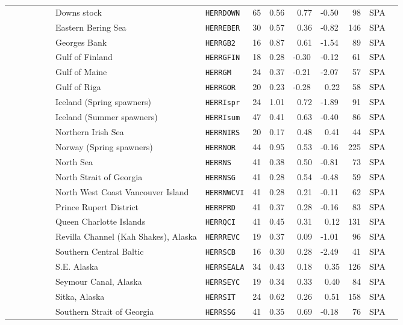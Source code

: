 \begin{flushleft}
\begin{tabular*}{7.1in}{llllllllll}
&~~~~~~~~~Downs stock&{\tt HERRDOWN}&65&0.56&~0.77&-0.50&~98&SPA  & \\ 
&~~~~~~~~~Eastern Bering Sea&{\tt HERREBER}&30&0.57&~0.36&-0.82&146&SPA  & \\ 
&~~~~~~~~~Georges Bank&{\tt HERRGB2}&16&0.87&~0.61&-1.54&~89&SPA  & \\ 
&~~~~~~~~~Gulf of Finland&{\tt HERRGFIN}&18&0.28&-0.30&-0.12&~61&SPA  & \\ 
&~~~~~~~~~Gulf of Maine&{\tt HERRGM}&24&0.37&-0.21&-2.07&~57&SPA  & \\ 
&~~~~~~~~~Gulf of Riga&{\tt HERRGOR}&20&0.23&-0.28&~0.22&~58&SPA  & \\ 
&~~~~~~~~~Iceland (Spring spawners)&{\tt HERRIspr}&24&1.01&~0.72&-1.89&~91&SPA  & \\ 
&~~~~~~~~~Iceland (Summer spawners)&{\tt HERRIsum}&47&0.41&~0.63&-0.40&~86&SPA  & \\ 
&~~~~~~~~~Northern Irish Sea&{\tt HERRNIRS}&20&0.17&~0.48&~0.41&~44&SPA  & \\ 
&~~~~~~~~~Norway (Spring spawners)&{\tt HERRNOR}&44&0.95&~0.53&-0.16&225&SPA  & \\ 
&~~~~~~~~~North Sea&{\tt HERRNS}&41&0.38&~0.50&-0.81&~73&SPA  & \\ 
&~~~~~~~~~North Strait of Georgia&{\tt HERRNSG}&41&0.28&~0.54&-0.48&~59&SPA  & \\ 
&~~~~~~~~~North West Coast Vancouver Island&{\tt HERRNWCVI}&41&0.28&~0.21&-0.11&~62&SPA  & \\ 
&~~~~~~~~~Prince Rupert District&{\tt HERRPRD}&41&0.37&~0.28&-0.16&~83&SPA  & \\ 
&~~~~~~~~~Queen Charlotte Islands&{\tt HERRQCI}&41&0.45&~0.31&~0.12&131&SPA  & \\ 
&~~~~~~~~~Revilla Channel (Kah Shakes), Alaska&{\tt HERRREVC}&19&0.37&~0.09&-1.01&~96&SPA  & \\ 
&~~~~~~~~~Southern Central Baltic&{\tt HERRSCB}&16&0.30&~0.28&-2.49&~41&SPA  & \\ 
&~~~~~~~~~S.E. Alaska&{\tt HERRSEALA}&34&0.43&~0.18&~0.35&126&SPA  & \\ 
&~~~~~~~~~Seymour Canal, Alaska&{\tt HERRSEYC}&19&0.34&~0.33&~0.40&~84&SPA  & \\ 
&~~~~~~~~~Sitka, Alaska&{\tt HERRSIT}&24&0.62&~0.26&~0.51&158&SPA  & \\ 
&~~~~~~~~~Southern Strait of Georgia&{\tt HERRSSG}&41&0.35&~0.69&-0.18&~76&SPA  & \\ 
\end{tabular*} 
\end{flushleft}
